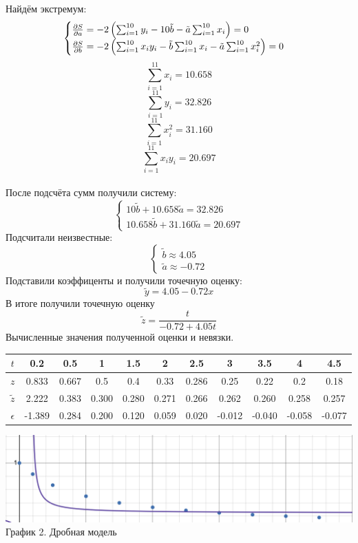\documentclass{article}
\begin{document}
Найдём экстремум:
\[\begin{cases}
    \pdv{S}{a} = -2\left(\sum_{i=1}^{10}y_i - 10\tilde{b} - \tilde{a}\sum_{i=1}^{10}x_i\right) = 0\\
    \pdv{S}{b} = -2\left(\sum_{i=1}^{10}x_iy_i - \tilde{b}\sum_{i=1}^{10}x_i - \tilde{a}\sum_{i=1}^{10}x_i^2\right) = 0
\end{cases}\]
\[\sum_{i=1}^{11}x_i = 10.658\]
\[\sum_{i=1}^{11}y_i = 32.826\]
\[\sum_{i=1}^{11}x_i^2 = 31.160\]
\[\sum_{i=1}^{11}x_iy_i = 20.697\]
\\
После подсчёта сумм получили систему:
\[\begin{cases}
    10\tilde{b} + 10.658\tilde{a} = 32.826\\
    10.658\tilde{b} + 31.160\tilde{a} = 20.697
\end{cases}\]
Подсчитали неизвестные:
\[\begin{cases}
    \tilde{b}  \approx 4.05\\
    \tilde{a}  \approx -0.72
\end{cases}\]
Подставили коэффиценты и получили точечную оценку:
\[\tilde{y} = 4.05 - 0.72x\]
В итоге получили точечную оценку
\[\tilde{z} = \frac{t}{-0.72 + 4.05t}\]
Вычисленные значения полученной оценки и невязки.
\begin{table}[H]
    \centering
    \begin{tabular}{|c|*{10}{c|}}
        \hline
        \(t\) & 0.2 & 0.5 & 1 & 1.5 & 2 & 2.5 & 3 & 3.5 & 4 & 4.5 \\
        \hline
        \(z\) &0.833&0.667 & 0.5& 0.4& 0.33& 0.286& 0.25& 0.22& 0.2& 0.18 \\
        \hline
        \(\tilde{z}\) & 2.222 & 0.383 & 0.300 & 0.280 & 0.271& 0.266& 0.262 & 0.260 & 0.258 & 0.257 \\
        \hline
        \(\epsilon\) & -1.389 & 0.284 & 0.200 & 0.120 & 0.059& 0.020 & -0.012 & -0.040 & -0.058 & -0.077  \\
        \hline
    \end{tabular}
\end{table}
\begin{center}
    \includegraphics[width=.9\textwidth]{drob.png}\\
    График 2. Дробная модель
\end{center}
\end{document}

